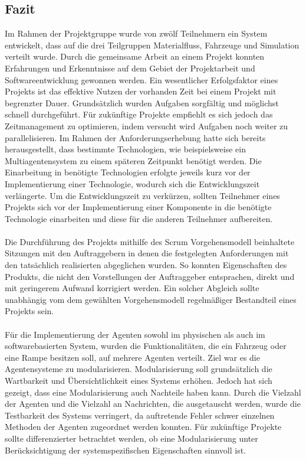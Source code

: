 \subsection{Fazit}
Im Rahmen der Projektgruppe wurde von zwölf Teilnehmern ein System entwickelt, dass auf die drei Teilgruppen Materialfluss, Fahrzeuge und Simulation verteilt wurde. Durch die gemeinsame Arbeit an einem Projekt konnten Erfahrungen und Erkenntnisse auf dem Gebiet der Projektarbeit und Softwareentwicklung gewonnen werden. Ein wesentlicher Erfolgsfaktor eines Projekts ist das effektive Nutzen der vorhanden Zeit bei einem Projekt mit begrenzter Dauer. Grundsätzlich wurden Aufgaben sorgfältig und möglichst schnell durchgeführt. Für zukünftige Projekte empfiehlt es sich jedoch das Zeitmanagement zu optimieren, indem versucht wird Aufgaben noch weiter zu parallelisieren. Im Rahmen der Anforderungserhebung hatte sich bereits herausgestellt, dass bestimmte Technologien, wie beispielsweise ein Multiagentensystem zu einem späteren Zeitpunkt benötigt werden. Die Einarbeitung in benötigte Technologien erfolgte jeweils kurz vor der Implementierung einer Technologie, wodurch sich die Entwicklungszeit verlängerte. Um die Entwicklungszeit zu verkürzen, sollten Teilnehmer eines Projekts sich vor der Implementierung einer Komponente in die benötigte Technologie einarbeiten und diese für die anderen Teilnehmer aufbereiten. 
\\\\
Die Durchführung des Projekts mithilfe des Scrum Vorgehensmodell beinhaltete Sitzungen mit den Auftraggebern in denen die festgelegten Anforderungen mit den tatsächlich realisierten abgeglichen wurden. So konnten Eigenschaften des Produkts, die nicht den Vorstellungen der Auftraggeber entsprachen, direkt und mit geringerem Aufwand korrigiert werden. Ein solcher Abgleich sollte unabhängig vom dem gewählten Vorgehensmodell regelmäßiger Bestandteil eines Projekts sein. 
\\\\
Für die Implementierung der Agenten sowohl im physischen als auch im softwarebasierten System, wurden die Funktionalitäten, die ein Fahrzeug oder eine Rampe besitzen soll, auf mehrere Agenten verteilt. Ziel war es die Agentensysteme zu modularisieren. Modularisierung soll grundsätzlich die Wartbarkeit und Übersichtlichkeit eines Systems erhöhen. Jedoch hat sich gezeigt, dass eine Modularisierung auch Nachteile haben kann. Durch die Vielzahl der Agenten und die Vielzahl an Nachrichten, die ausgetauscht werden, wurde die Testbarkeit des Systems verringert, da auftretende Fehler schwer einzelnen Methoden der Agenten zugeordnet werden konnten. Für zukünftige Projekte sollte differenzierter betrachtet werden, ob eine Modularisierung unter Berücksichtigung der systemspezifischen Eigenschaften sinnvoll ist. 

